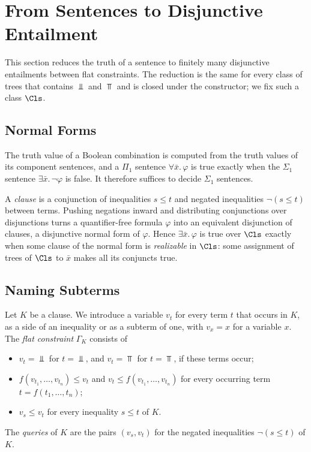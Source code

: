\section{From Sentences to Disjunctive Entailment}
\label{sec:sentences}

This section reduces the truth of a sentence to finitely many disjunctive
entailments between flat constraints. The reduction is the same for every
class of trees that contains $\Bot$ and $\Top$ and is closed under the
constructor; we fix such a class $\Cls$.

\subsection{Normal Forms}\label{sec:sent-nf}

The truth value of a Boolean combination is computed from the truth values of
its component sentences, and a $\Pi_1$ sentence $\forall\bar x.\,\varphi$ is
true exactly when the $\Sigma_1$ sentence $\exists\bar x.\,\neg\varphi$ is
false. It therefore suffices to decide $\Sigma_1$ sentences.

A \emph{clause} is a conjunction of inequalities $s\le t$ and negated
inequalities $\neg(s\le t)$ between terms. Pushing negations inward and
distributing conjunctions over disjunctions turns a quantifier-free formula
$\varphi$ into an equivalent disjunction of clauses, a disjunctive normal form
of $\varphi$. Hence $\exists\bar x.\,\varphi$ is true over $\Cls$ exactly
when some clause of the normal form is \emph{realizable} in $\Cls$: some
assignment of trees of $\Cls$ to $\bar x$ makes all its conjuncts true.

\subsection{Naming Subterms}\label{sec:sent-flat}

Let $K$ be a clause. We introduce a variable $v_t$ for every term $t$ that
occurs in $K$, as a side of an inequality or as a subterm of one, with
$v_x=x$ for a variable $x$. The \emph{flat constraint} $\Gamma_K$ consists of
\begin{itemize}
\item $v_t=\Bot$ for $t=\Bot$, and $v_t=\Top$ for $t=\Top$, if these terms
  occur;
\item $f(v_{t_1},\dots,v_{t_n})\le v_t$ and $v_t\le f(v_{t_1},\dots,v_{t_n})$
  for every occurring term $t=f(t_1,\dots,t_n)$;
\item $v_s\le v_t$ for every inequality $s\le t$ of $K$.
\end{itemize}
The \emph{queries} of $K$ are the pairs $(v_s,v_t)$ for the negated
inequalities $\neg(s\le t)$ of $K$.

